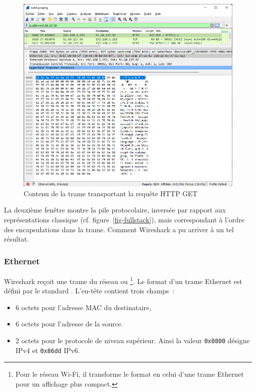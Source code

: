 \begin{figure}[tbp]
\centerline{\includegraphics[width=1\columnwidth]{Pictures/ws-GET.png}}
\caption{Contenu de la trame transportant la requête HTTP GET}
\label{fig-ws-GET}
\end{figure}

  \vspace{1em}

La deuxième fenêtre montre la pile protocolaire, inversée par rapport aux représentations classique (cf. figure~\vref{fig-fullstack}), mais correspondant à l'ordre des encapsulations dans la trame. Comment Wireshark a pu arriver à un tel résultat.

\subsubsection{Ethernet}

Wireshark reçoit une trame du réseau  ou \footnote{Pour le réseau Wi-Fi, il transforme le format en celui d'une trame Ethernet pour un affichage plus compact.}. Le format d'un trame Ethernet est défini par le standard . L'en-tête contient trois champs~: 
\begin{itemize}
    \item 6 octets pour l'adresse MAC du destinataire,
    \item 6 octets pour l'adresse de la source.
    \item 2 octets pour le protocole de niveau supérieur. Ainsi la valeur \texttt{0x0800} désigne IPv4 et \texttt{0x86dd} IPv6.
\end{itemize}

